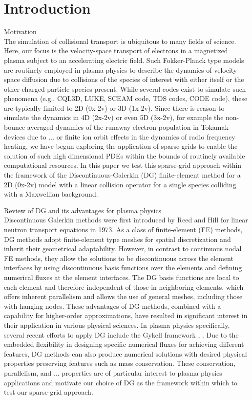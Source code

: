 \documentclass[preprint,11pt]{elsarticle}
\begin{document}
\section{Introduction}
\label{sec:intro}
{\tiny\color{red} Motivation\\}
The simulation of collisional transport is ubiquitous to many fields of science. Here, our focus is the velocity-space transport of electrons in a magnetized plasma subject to an accelerating electric field. Such Fokker-Planck type models are routinely employed in plasma physics to describe the dynamics of velocity-space diffusion due to collisions of the species of interest with either itself or the other charged particle species present. While several codes exist to simulate such phenomena (e.g., CQL3D, LUKE, SCEAM code, TDS codes, CODE code), these are typically limited to 2D (0x-2v) or 3D (1x-2v). Since there is reason to simulate the dynamics in 4D (2x-2v) or even 5D (3x-2v), for example the non-bounce averaged dynamics of the runaway electron population in Tokamak devices due to ...  or finite ion orbit effects in the dynamics of radio frequency heating, we have begun exploring the application of sparse-grids \cite{} to enable the solution of such high dimensional PDEs within the bounds of routinely available computational resources. In this paper we test this sparse-grid approach within the framework of the Discontinuous-Galerkin (DG) finite-element method for a 2D (0x-2v) model with a linear collision operator for a single species colliding with a Maxwellian background.  
      
{\tiny\color{red} Review of DG and its advantages for plasma physics\\}
Discontinuous Galerkin methods were first introduced by Reed and Hill \cite{ReedHill1973} for linear neutron transport equations in 1973. As a class of finite-element (FE) methods, DG methods \cite{HesthavenWarburton2008} adopt finite-element type meshes for spatial discretization and inherit their geometrical adaptability. However, in contrast to continuous nodal FE methods, they allow the solutions to be discontinuous across the element interfaces by using discontinuous basis functions over the elements and defining numerical fluxes at the element interfaces. The DG basis functions are local to each element and therefore independent of those in neighboring elements, which offers inherent parallelism and allows the use of general meshes, including those with hanging nodes. These advantages of DG methods, combined with a capability for higher-order approximations, have resulted in significant interest in their application in various physical sciences. In plasma physics specifically, several recent efforts to apply DG include the Gykell framework \cite{},  . Due to the embedded flexibility in designing specific numerical fluxes for achieving different features, DG methods can also produce numerical solutions with desired physical properties preserving features such as mass conservation. These conservation, parallelism, and ...  properties are of particular interest to plasma physics applications and motivate our choice of DG as the framework within which to test our sparse-grid approach.  
\end{document}
